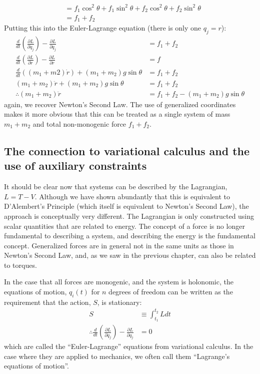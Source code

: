 \begin{example}{0pt}
\begin{align*}
&=f_1\cos^2{\theta}+f_1\sin^2{\theta}+f_2\cos^2{\theta}+f_2\sin^2{\theta}\nonumber\\
&=f_1+f_2
\end{align*}
Putting this into the Euler-Lagrange equation (there is only one $q_j=r$):
\begin{align*}
\frac{d}{dt}\left(\frac{\partial L}{\partial \dot{q}_j} \right) - \frac{\partial L}{\partial q_j}&=f_1+f_2\nonumber\\
\frac{d}{dt}\left(\frac{\partial L}{\partial \dot{r}} \right) - \frac{\partial L}{\partial r}&=f\nonumber\\
\frac{d}{dt}((m_1+m2)\dot{r})+(m_1+m_2)g\sin{\theta}&=f_1+f_2\nonumber\\
(m_1+m_2)\ddot{r}+(m_1+m_2)g\sin{\theta}&=f_1+f_2\nonumber\\
\therefore (m_1+m_2)\ddot{r}&=f_1+f_2-(m_1+m_2)g\sin{\theta}
\end{align*}
again, we recover Newton's Second Law. The use of generalized coordinates makes it more obvious that this can be treated as a single system of mass $m_1+m_2$ and total non-monogenic force $f_1+f_2$.
\end{example} 

\subsection{The connection to variational calculus and the use of auxiliary constraints}
It should be clear now that systems can be described by the Lagrangian, $L=T-V$. Although we have shown abundantly that this is equivalent to D'Alembert's Principle (which itself is equivalent to Newton's Second Law), the approach is conceptually very different. The Lagrangian is only constructed using scalar quantities that are related to energy. The concept of a force is no longer fundamental to describing a system, and describing the energy is the fundamental concept. Generalized forces are in general not in the same units as those in Newton's Second Law, and, as we saw in the previous chapter, can also be related to torques. 

In the case that all forces are monogenic, and the system is holonomic, the equations of motion, $q_i(t)$ for $n$ degrees of freedom can be written as the requirement that the action, $S$, is stationary:
\begin{align}
S&\equiv\int_{t_1}^{t_2}Ldt\nonumber\\
\therefore \frac{d}{dt}\left(\frac{\partial L}{\partial \dot{q}_j} \right) - \frac{\partial L}{\partial q_j}&=0
\end{align}
which are called the ``Euler-Lagrange'' equations from variational calculus. In the case where they are applied to mechanics, we often call them ``Lagrange's equations of motion''.

